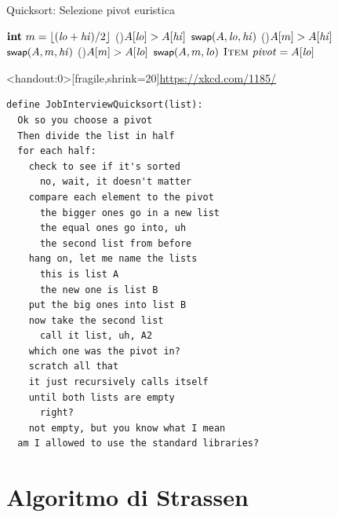 \begin{frame}{Quicksort: Selezione pivot euristica}


\begin{Procedure}
\caption[A]{\INTEGER \Perno($\Item[\,]\ A$, \INTEGER $\Primo$, \INTEGER $\Ultimo$)}
$\INTEGER\ m = \lfloor (\Primo+\Ultimo)/2 \rfloor$\;
\If(){$A[\mathit{lo}] > A[\mathit{hi}]$}{
  $\textsf{{\small swap}}(A,\mathit{lo},\mathit{hi})$\;
}
\If(){$A[m] > A[\mathit{hi}]$}{
  $\textsf{{\small swap}}(A,m,\mathit{hi})$\;
}
\If(){$A[m] > A[\mathit{lo}]$}{
  $\textsf{{\small swap}}(A,m,\mathit{lo})$\;
}
$\textsc{Item}\ \mathit{pivot} = A[\mathit{lo}]$\;
[...]\;
\end{Procedure}

\end{frame}

\begin{frame}<handout:0>[fragile,shrink=20]{\url{https://xkcd.com/1185/}}
\vspace{-12pt}
\begin{lstlisting}
define JobInterviewQuicksort(list):
  Ok so you choose a pivot
  Then divide the list in half
  for each half:
    check to see if it's sorted
      no, wait, it doesn't matter
    compare each element to the pivot
      the bigger ones go in a new list
      the equal ones go into, uh
      the second list from before
    hang on, let me name the lists
      this is list A
      the new one is list B
    put the big ones into list B
    now take the second list
      call it list, uh, A2
    which one was the pivot in?
    scratch all that
    it just recursively calls itself
    until both lists are empty
      right?
    not empty, but you know what I mean
  am I allowed to use the standard libraries?
\end{lstlisting}

\end{frame}



\section{Algoritmo di Strassen}

